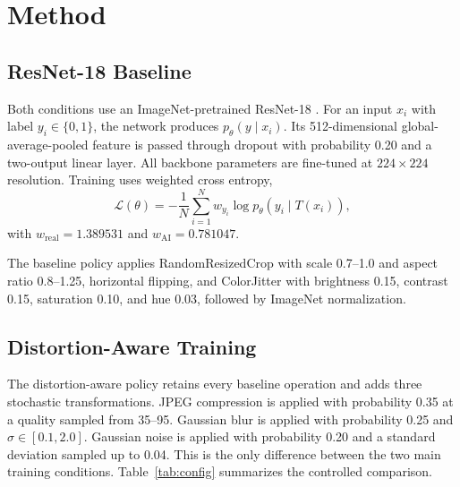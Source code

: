 \documentclass[conference]{IEEEtran}
\begin{document}
\section{Method}
\label{sec:method}

\subsection{ResNet-18 Baseline}

Both conditions use an ImageNet-pretrained ResNet-18 \cite{he2016resnet}. For
an input $x_i$ with label $y_i\in\{0,1\}$, the network produces
$p_\theta(y\mid x_i)$. Its 512-dimensional global-average-pooled feature is
passed through dropout with probability 0.20 and a two-output linear layer.
All backbone parameters are fine-tuned at $224\times224$ resolution. Training
uses weighted cross entropy,
\begin{equation}
\mathcal{L}(\theta)=-\frac{1}{N}\sum_{i=1}^{N}w_{y_i}
\log p_\theta(y_i\mid T(x_i)),
\label{eq:loss}
\end{equation}
with $w_{\mathrm{real}}=1.389531$ and
$w_{\mathrm{AI}}=0.781047$.

The baseline policy applies
RandomResizedCrop with scale 0.7--1.0 and aspect ratio 0.8--1.25, horizontal
flipping, and ColorJitter with brightness 0.15, contrast 0.15, saturation
0.10, and hue 0.03, followed by ImageNet normalization.

\subsection{Distortion-Aware Training}

The distortion-aware policy retains every baseline operation and adds three
stochastic transformations. JPEG compression is applied with probability
0.35 at a quality sampled from 35--95. Gaussian blur is applied with
probability 0.25 and $\sigma\in[0.1,2.0]$. Gaussian noise is applied with
probability 0.20 and a standard deviation sampled up to 0.04. This is the only
difference between the two main training conditions.
Table~\ref{tab:config} summarizes the controlled comparison.
\end{document}
